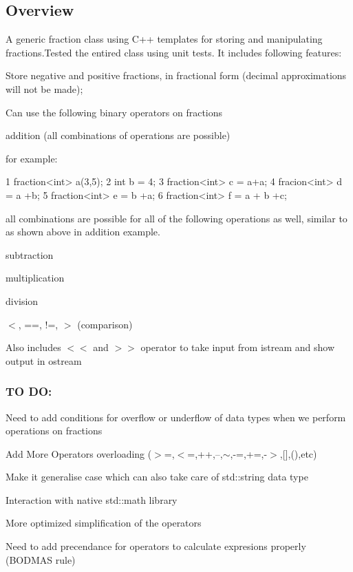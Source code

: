 \subsection*{Overview}

A generic fraction class using C++ templates for storing and manipulating fractions.\+Tested the entired class using unit tests. It includes following features\+:
\begin{DoxyItemize}
\item Store negative and positive fractions, in fractional form (decimal approximations will not be made);
\item Can use the following binary operators on fractions
\item addition (all combinations of operations are possible)
\end{DoxyItemize}

for example\+: 
\begin{DoxyCode}
1 fraction<int> a(3,5);
2 int b = 4;
3 fraction<int> c = a+a;
4 fracion<int> d = a +b;
5 fraction<int> e = b +a;
6 fraction<int> f = a + b +c;
\end{DoxyCode}
 all combinations are possible for all of the following operations as well, similar to as shown above in addition example.
\begin{DoxyItemize}
\item subtraction
\item multiplication
\item division
\item $<$, ==, !=, $>$ (comparison)
\end{DoxyItemize}

Also includes $<$$<$ and $>$$>$ operator to take input from istream and show output in ostream

\subsubsection*{TO DO\+:}


\begin{DoxyItemize}
\item Need to add conditions for overflow or underflow of data types when we perform operations on fractions
\item Add More Operators overloading ($>$=,$<$=,++,--,$\sim$,-\/=,+=,-\/$>$,\mbox{[}\mbox{]},(),etc)
\item Make it generalise case which can also take care of std\+::string data type
\item Interaction with native std\+::math library
\item More optimized simplification of the operators
\item Need to add precendance for operators to calculate expresions properly (B\+O\+D\+M\+AS rule)
\end{DoxyItemize}

